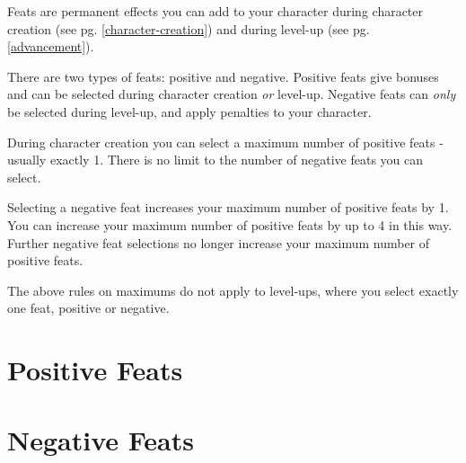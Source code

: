 \begin{multicols*}{2}
    Feats are permanent effects you can add to your character during character creation (see
    pg. \ref{character-creation}) and during level-up (see pg.
    \ref{advancement}).

    There are two types of feats: positive and negative. Positive feats give
    bonuses and can be selected during character creation \textit{or} level-up.
    Negative feats can \textit{only} be selected during level-up, and apply
    penalties to your character.

    During character creation you can select a maximum number of positive
    feats - usually exactly 1. There is no limit to the number of negative
    feats you can select.

    Selecting a negative feat increases your maximum number of positive feats
    by 1. You can increase your maximum number of positive feats by up to
    4 in this way. Further negative feat selections no longer increase your
    maximum number of positive feats.

    The above rules on maximums do not apply to level-ups, where you select
    exactly one feat, positive or negative.

    \section{Positive Feats}

    \section{Negative Feats}
\end{multicols*}
